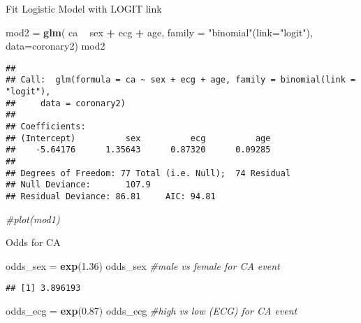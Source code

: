 \documentclass[]{article}
\newenvironment{Shaded}{\begin{snugshade}}{\end{snugshade}}
\newcommand{\KeywordTok}[1]{\textcolor[rgb]{0.13,0.29,0.53}{\textbf{#1}}}
\newcommand{\DataTypeTok}[1]{\textcolor[rgb]{0.13,0.29,0.53}{#1}}
\newcommand{\FloatTok}[1]{\textcolor[rgb]{0.00,0.00,0.81}{#1}}
\newcommand{\StringTok}[1]{\textcolor[rgb]{0.31,0.60,0.02}{#1}}
\newcommand{\CommentTok}[1]{\textcolor[rgb]{0.56,0.35,0.01}{\textit{#1}}}
\newcommand{\OperatorTok}[1]{\textcolor[rgb]{0.81,0.36,0.00}{\textbf{#1}}}
\newcommand{\NormalTok}[1]{#1}
\begin{document}
Fit Logistic Model with LOGIT link

\begin{Shaded}
\begin{Highlighting}[]
\NormalTok{mod2 =}\StringTok{ }\KeywordTok{glm}\NormalTok{( ca }\OperatorTok{~}\StringTok{ }\NormalTok{sex }\OperatorTok{+}\StringTok{ }\NormalTok{ecg }\OperatorTok{+}\StringTok{ }\NormalTok{age,}
            \DataTypeTok{family =} \StringTok{"binomial"}\NormalTok{(}\DataTypeTok{link=}\StringTok{"logit"}\NormalTok{),}
            \DataTypeTok{data=}\NormalTok{coronary2)}
\NormalTok{mod2}
\end{Highlighting}
\end{Shaded}

\begin{verbatim}
## 
## Call:  glm(formula = ca ~ sex + ecg + age, family = binomial(link = "logit"), 
##     data = coronary2)
## 
## Coefficients:
## (Intercept)          sex          ecg          age  
##    -5.64176      1.35643      0.87320      0.09285  
## 
## Degrees of Freedom: 77 Total (i.e. Null);  74 Residual
## Null Deviance:       107.9 
## Residual Deviance: 86.81     AIC: 94.81
\end{verbatim}

\begin{Shaded}
\begin{Highlighting}[]
\CommentTok{#plot(mod1)}
\end{Highlighting}
\end{Shaded}

Odds for CA

\begin{Shaded}
\begin{Highlighting}[]
\NormalTok{odds_sex =}\StringTok{ }\KeywordTok{exp}\NormalTok{(}\FloatTok{1.36}\NormalTok{)}
\NormalTok{odds_sex                   }\CommentTok{#male vs female for CA event}
\end{Highlighting}
\end{Shaded}

\begin{verbatim}
## [1] 3.896193
\end{verbatim}

\begin{Shaded}
\begin{Highlighting}[]
\NormalTok{odds_ecg =}\StringTok{ }\KeywordTok{exp}\NormalTok{(}\FloatTok{0.87}\NormalTok{)}
\NormalTok{odds_ecg                   }\CommentTok{#high vs low (ECG) for CA event}
\end{Highlighting}
\end{Shaded}
\end{document}
